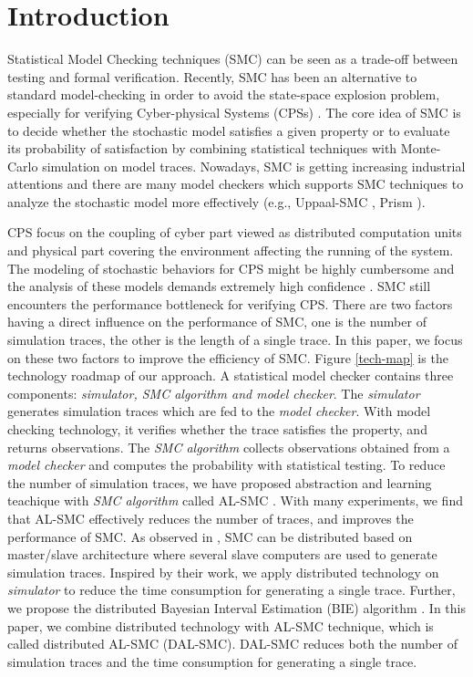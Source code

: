 \section{Introduction}

Statistical Model Checking techniques (SMC) \cite{Younes2004Planning,Sen2004Statistical,herault2004} can be seen as a trade-off between testing and formal verification. Recently, SMC has been an alternative to standard model-checking in order to avoid the state-space explosion problem, especially for verifying Cyber-physical Systems (CPSs) \cite{Yoo2016Challenges}. The core idea of SMC is to decide whether the stochastic model satisfies a given property or to evaluate its probability of satisfaction by combining statistical techniques with Monte-Carlo simulation on model traces. Nowadays, SMC is getting increasing industrial attentions and there are many model checkers which supports SMC techniques to analyze the stochastic model more effectively (e.g., Uppaal-SMC \cite{Bulychev2012UPPAAL}, Prism \cite{Kwiatkowska2002PRISM}).

CPS focus on the coupling of cyber part viewed as distributed computation units and physical part covering the environment affecting the running of the system. The modeling of stochastic behaviors for CPS might be highly cumbersome \cite{basu2010statistical} and the analysis of these models demands extremely high confidence \cite{du2015smc4rare}. SMC still encounters the performance bottleneck for verifying CPS. There are two factors having a direct influence on the performance of SMC, one is the number of simulation traces, the other is the length of a single trace.  In this paper, we focus on these two factors to improve the efficiency of SMC. Figure \ref{tech-map} is the technology roadmap of our approach. A statistical model checker contains three components: \emph{simulator, SMC algorithm and model checker}. The \emph{simulator} generates simulation traces which are fed to the \emph{model checker}.  With model checking technology, it verifies whether the trace satisfies the property, and returns observations. The \emph{SMC algorithm} collects observations obtained from a \emph{model checker} and computes the probability with statistical testing. To reduce the number of simulation traces, we have proposed abstraction and learning teachique with \emph{SMC algorithm} called AL-SMC \cite{jiangkaiqiang2016}. With many experiments, we find that AL-SMC effectively reduces the number of traces, and improves the performance of SMC. As observed in \cite{younes2005ymer}, SMC can be distributed based on master/slave architecture where several slave computers are used to generate simulation traces. Inspired by their work, we apply distributed technology on \emph{simulator} to reduce the time consumption for generating a single trace. Further, we propose the distributed Bayesian Interval Estimation (BIE) algorithm \cite{zuliani2013bayesian}. In this paper, we combine distributed technology with AL-SMC technique, which is called distributed AL-SMC (DAL-SMC).  DAL-SMC reduces both the number of simulation traces and the time consumption for generating a single trace.

